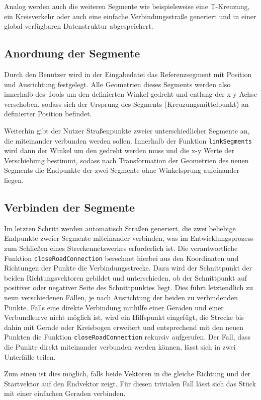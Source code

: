 Analog werden auch die weiteren Segmente wie beispielsweise eine T-Kreuzung, ein Kreisverkehr oder auch eine einfache Verbindungsstraße generiert und in einer global verfügbaren Datenstruktur abgespeichert.

\subsection{Anordnung der Segmente}

Durch den Benutzer wird in der Eingabedatei das Referenzsegment mit Position und Ausrichtung festgelegt. Alle Geometrien dieses Segments werden also innerhalb des Tools um den definierten Winkel gedreht und entlang der x-y Achse verschoben, sodass sich der Ursprung des Segments (Kreuzungsmittelpunkt) an definierter Position befindet.

Weiterhin gibt der Nutzer Straßenpunkte zweier unterschiedlicher Segmente an, die miteinander verbunden werden sollen. Innerhalb der Funktion \texttt{linkSegments} wird dann der Winkel um den gedreht werden muss und die x-y Werte der Verschiebung bestimmt, sodass nach Transformation der Geometrien des neuen Segments die Endpunkte der zwei Segmente ohne Winkelsprung aufeinander liegen.

\subsection{Verbinden der Segmente}

Im letzten Schritt werden automatisch Straßen generiert, die zwei beliebige Endpunkte zweier Segmente miteinander verbinden, was im Entwicklungsprozess zum Schließen eines Streckennetzwerkes erforderlich ist. Die verantwortliche Funktion \texttt{closeRoadConnection} berechnet hierbei aus den Koordinaten und Richtungen der Punkte die Verbindungsstrecke. Dazu wird der Schnittpunkt der beiden Richtungsvektoren gebildet und unterschieden, ob der Schnittpunkt auf positiver oder negativer Seite des Schnittpunktes liegt. Dies führt letztendlich zu neun verschiedenen Fällen, je nach Ausrichtung der beiden zu verbindenden Punkte. Falls eine direkte Verbindung mithilfe einer Geraden und einer Verbundkurve nicht möglich ist, wird ein Hilfspunkt eingefügt, die Strecke bis dahin mit Gerade oder Kreisbogen erweitert und entsprechend mit den neuen Punkten die Funktion \texttt{closeRoadConnection} rekursiv aufgerufen. Der Fall, dass die Punkte direkt miteinander verbunden werden können, lässt sich in zwei Unterfälle teilen.

Zum einen ist dies möglich, falls beide Vektoren in die gleiche Richtung und der Startvektor auf den Endvektor zeigt. Für diesen trivialen Fall lässt sich das Stück mit einer einfachen Geraden verbinden.

